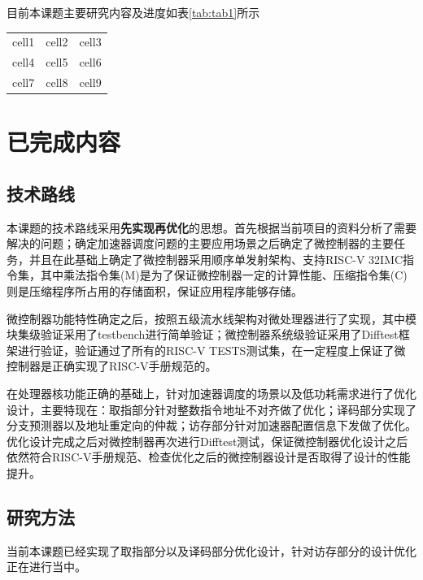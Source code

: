\documentclass[a4paper, 12pt]{article}
\begin{document}
目前本课题主要研究内容及进度如表\ref{tab:tab1}所示
\begin{center}
\begin{tabular}{ c c c }
  \label{tab:tab1}
 cell1 & cell2 & cell3 \\ 
 cell4 & cell5 & cell6 \\  
 cell7 & cell8 & cell9    
\end{tabular}
\end{center}

\newpage
\section{已完成内容}%
\subsection{技术路线}%
本课题的技术路线采用\textbf{先实现再优化}的思想。首先根据当前项目的资料分析了需要解决的问题；确定加速器调度问题的主要应用场景之后确定了微控制器的主要任务，并且在此基础上确定了微控制器采用顺序单发射架构、支持RISC-V 32IMC指令集，其中乘法指令集(M)是为了保证微控制器一定的计算性能、压缩指令集(C)则是压缩程序所占用的存储面积，保证应用程序能够存储。

微控制器功能特性确定之后，按照五级流水线架构对微处理器进行了实现，其中模块集级验证采用了testbench进行简单验证；微控制器系统级验证采用了Difftest框架进行验证，验证通过了所有的RISC-V TESTS测试集，在一定程度上保证了微控制器是正确实现了RISC-V手册规范的。

在处理器核功能正确的基础上，针对加速器调度的场景以及低功耗需求进行了优化设计，主要特现在：取指部分针对整数指令地址不对齐做了优化；译码部分实现了分支预测器以及地址重定向的仲裁；访存部分针对加速器配置信息下发做了优化。优化设计完成之后对微控制器再次进行Difftest测试，保证微控制器优化设计之后依然符合RISC-V手册规范、检查优化之后的微控制器设计是否取得了设计的性能提升。
  
\newpage
\subsection{研究方法}%
当前本课题已经实现了取指部分以及译码部分优化设计，针对访存部分的设计优化正在进行当中。
\end{document}
